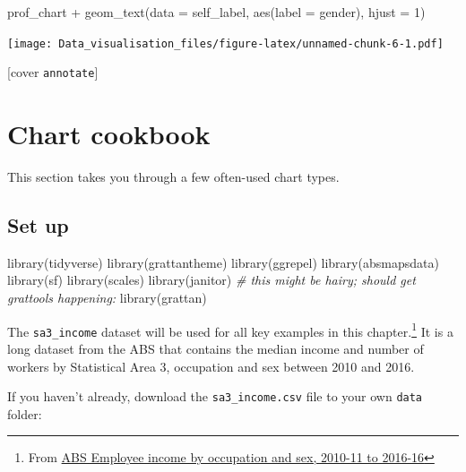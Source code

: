 \documentclass[
]{book}
\newenvironment{Shaded}{\begin{snugshade}}{\end{snugshade}}
\newcommand{\AttributeTok}[1]{\textcolor[rgb]{0.77,0.63,0.00}{#1}}
\newcommand{\CommentTok}[1]{\textcolor[rgb]{0.56,0.35,0.01}{\textit{#1}}}
\newcommand{\DecValTok}[1]{\textcolor[rgb]{0.00,0.00,0.81}{#1}}
\newcommand{\FunctionTok}[1]{\textcolor[rgb]{0.00,0.00,0.00}{#1}}
\newcommand{\NormalTok}[1]{#1}
\newcommand{\SpecialCharTok}[1]{\textcolor[rgb]{0.00,0.00,0.00}{#1}}
\begin{document}
\begin{Shaded}
\begin{Highlighting}[]
\NormalTok{prof\_chart }\SpecialCharTok{+}
  \FunctionTok{geom\_text}\NormalTok{(}\AttributeTok{data =}\NormalTok{ self\_label,}
            \FunctionTok{aes}\NormalTok{(}\AttributeTok{label =}\NormalTok{ gender), }
            \AttributeTok{hjust =} \DecValTok{1}\NormalTok{)}
\end{Highlighting}
\end{Shaded}

\texttt{[image: Data\_visualisation\_files/figure-latex/unnamed-chunk-6-1.pdf]}

{[}cover \texttt{annotate}{]}

\hypertarget{chart-cookbook}{%
\chapter{Chart cookbook}\label{chart-cookbook}}

This section takes you through a few often-used chart types.

\hypertarget{set-up-1}{%
\section{Set up}\label{set-up-1}}

\begin{Shaded}
\begin{Highlighting}[]
\FunctionTok{library}\NormalTok{(tidyverse)}
\FunctionTok{library}\NormalTok{(grattantheme)}
\FunctionTok{library}\NormalTok{(ggrepel)}
\FunctionTok{library}\NormalTok{(absmapsdata)}
\FunctionTok{library}\NormalTok{(sf)}
\FunctionTok{library}\NormalTok{(scales)}
\FunctionTok{library}\NormalTok{(janitor)}
\CommentTok{\# this might be hairy; should get \textasciigrave{}grattools\textasciigrave{} happening:}
\FunctionTok{library}\NormalTok{(grattan)}
\end{Highlighting}
\end{Shaded}

The \texttt{sa3\_income} dataset will be used for all key examples in this chapter.\footnote{From \href{https://www.abs.gov.au/AUSSTATS/abs@.nsf/DetailsPage/6524.0.55.0022011-2016?OpenDocument}{ABS Employee income by occupation and sex, 2010-11 to 2016-16}} It is a long dataset from the ABS that contains the median income and number of workers by Statistical Area 3, occupation and sex between 2010 and 2016.

If you haven't already, download the \texttt{sa3\_income.csv} file to your own \texttt{data} folder:
\end{document}

